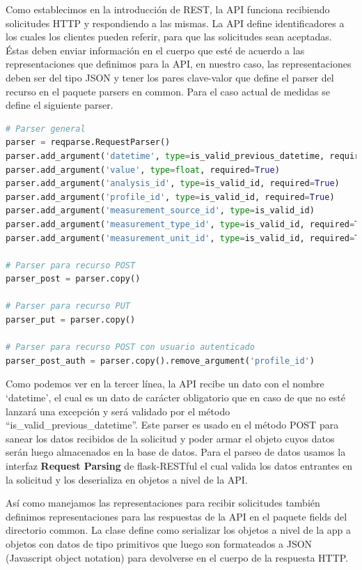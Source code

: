 \documentclass[a4paper,12pt]{article}
\begin{document}
\begin{itemize}
Como establecimos en la introducción de REST, la API funciona recibiendo solicitudes HTTP y respondiendo a las mismas. La API define identificadores a los cuales los clientes pueden referir, para que las solicitudes sean aceptadas. Éstas deben enviar información en el cuerpo que esté de acuerdo a las representaciones que definimos para la API, en nuestro caso, las representaciones deben ser del tipo JSON y tener los pares clave-valor que define el parser del recurso en el paquete parsers en common. Para el caso actual de medidas se define el siguiente parser.

\begin{lstlisting}[language=Python]
# Parser general
parser = reqparse.RequestParser()
parser.add_argument('datetime', type=is_valid_previous_datetime, required=True)
parser.add_argument('value', type=float, required=True)
parser.add_argument('analysis_id', type=is_valid_id, required=True)
parser.add_argument('profile_id', type=is_valid_id, required=True)
parser.add_argument('measurement_source_id', type=is_valid_id)
parser.add_argument('measurement_type_id', type=is_valid_id, required=True)
parser.add_argument('measurement_unit_id', type=is_valid_id, required=True)

# Parser para recurso POST
parser_post = parser.copy()

# Parser para recurso PUT
parser_put = parser.copy()

# Parser para recurso POST con usuario autenticado
parser_post_auth = parser.copy().remove_argument('profile_id')
\end{lstlisting}

Como podemos ver en la tercer línea, la API recibe un dato con el nombre ‘datetime’, el cual es un dato de carácter obligatorio que en caso de que no esté lanzará una excepción y será validado  por el método ``is\_valid\_previous\_datetime''. Este parser es usado en el método POST para sanear los datos recibidos de la solicitud y poder armar el objeto cuyos datos serán luego almacenados en la base de datos. Para el parseo de datos usamos la interfaz \textbf{Request Parsing} de flask-RESTful el cual valida los datos entrantes en la solicitud y los deserializa en objetos a nivel de la API.

Así como manejamos las representaciones para recibir solicitudes también definimos representaciones para las respuestas de la API en el paquete fields del directorio common. La clase define como serializar los objetos a nivel de la app a objetos con datos de tipo primitivos que luego son formateados a JSON (Javascript object notation) para devolverse en el cuerpo de la respuesta HTTP.


\end{itemize}
\end{document}
